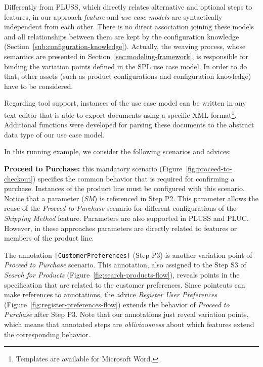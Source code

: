 Differently from PLUSS, which directly relates alternative and
optional steps to features, in our approach \emph{feature} and \emph{use case
models} are syntactically independent from each other. There is no direct
association joining these models and all relationships between them are kept by
the configuration knowledge (Section~\ref{sub:configuration-knowledge}).
 Actually, the weaving process, whose semantics are presented in
 Section~\ref{sec:modeling-framework}, is responsible for binding the variation
 points defined in the SPL use case model. In order to do that, other assets
 (such as product configurations and configuration knowledge) have to be
 considered.

Regarding tool support, instances of the use case model can
be written in any text editor that is able to export documents using a specific
XML format\footnote{Templates are available for Microsoft Word.}. Additional functions were
developed for parsing these documents to the abstract data type of our use case
model.

In this running example, we consider the following scenarios and advices:

{\bf Proceed to Purchase:} this mandatory scenario
(Figure~\ref{fig:proceed-to-checkout}) specifies the common behavior that is
required for confirming a purchase. Instances of the product line must be
configured with this scenario. 
Notice that a parameter (\emph{SM}) is referenced in Step P2. 
This parameter allows the reuse of the \emph{Proceed to
Purchase} scenario for different configurations of the \emph{Shipping Method} feature. Parameters 
are also supported in PLUSS and PLUC. However, in these approaches parameters are directly related to features or members of the product line.

The annotation \mbox{\texttt{[CustomerPreferences]}} (Step P3) is
another variation point of \emph{Proceed to Purchase} scenario. This annotation, also assigned to the Step S3 of \emph{Search for Products} (Figure~\ref{fig:search-products-flow}), reveals points in the specification that are related to the customer preferences. Since pointcuts can make references to annotations, the advice \emph{Register User Preferences} (Figure~\ref{fig:register-preferences-flow}) extends the behavior of \emph{Proceed to Purchase} after Step P3. Note that our annotations just reveal variation points, which means that annotated steps are \emph{obliviousness} about which features extend the corresponding behavior. 


